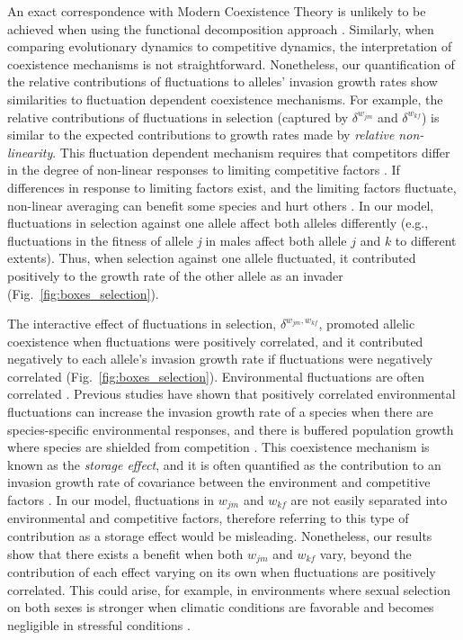 \begin{refsection}
An exact correspondence with Modern Coexistence Theory is unlikely to be achieved when using the functional decomposition approach \citep{ellner2016quantify,shoemaker2020}. Similarly, when comparing evolutionary dynamics to competitive dynamics, the interpretation of coexistence mechanisms is not straightforward. Nonetheless, our quantification of the relative contributions of fluctuations to alleles' invasion growth rates show similarities to fluctuation dependent coexistence mechanisms. For example, the relative contributions of fluctuations in selection (captured by $\delta^{w_{jm}}$ and $\delta^{w_{kf}}$) is similar to the expected contributions to growth rates made by \textit{relative non-linearity}. This fluctuation dependent mechanism requires that competitors differ in the degree of non-linear responses to limiting competitive factors \citep{chesson2000mechanisms,chesson2003quantifying,zepeda2019fluctuation}. If differences in response to limiting factors exist, and the limiting factors fluctuate, non-linear averaging can benefit some species and hurt others \citep{ellner_expanded_2019}. In our model, fluctuations in selection against one allele affect both alleles differently (e.g., fluctuations in the fitness of allele \textit{j} in males affect both allele $j$ and $k$ to different extents). Thus, when selection against one allele fluctuated, it contributed positively to the growth rate of the other allele as an invader (Fig.~\ref{fig:boxes_selection}).


The interactive effect of fluctuations in selection, $\delta^{w_{jm},w_{kf}}$, promoted allelic coexistence when fluctuations were positively correlated, and it contributed negatively to each allele's invasion growth rate if fluctuations were negatively correlated (Fig.~\ref{fig:boxes_selection}). Environmental fluctuations are often correlated \citep{steele1985comparison}. Previous studies have shown that positively correlated environmental fluctuations can increase the invasion growth rate of a species when there are species-specific environmental responses, and there is buffered population growth where species are shielded from competition \citep{schreiber2021positively,chesson2000mechanisms}. This coexistence mechanism is known as the \textit{storage effect}, and it is often quantified as the contribution to an invasion growth rate of covariance between the environment and competitive factors \citep{ellner2016quantify,zepeda2019fluctuation}. In our model, fluctuations in $w_{jm}$ and $w_{kf}$ are not easily separated into environmental and competitive factors, therefore referring to this type of contribution as a storage effect would be misleading. Nonetheless, our results show that there exists a benefit when both $w_{jm}$ and $w_{kf}$ vary, beyond the contribution of each effect varying on its own when fluctuations are positively correlated. This could arise, for example, in environments where sexual selection on both sexes is stronger when climatic conditions are favorable and becomes negligible in stressful conditions \citep{cockburn2008swingin}.


\end{refsection}
